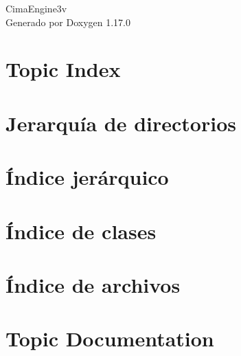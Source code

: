 \documentclass[twoside]{book}
\newcommand{\+}{\discretionary{\mbox{\scriptsize$\hookleftarrow$}}{}{}}
\newcommand{\clearemptydoublepage}{%
    \newpage{\pagestyle{empty}\cleardoublepage}%
  }
\begin{document}
  \raggedbottom
    \hypersetup{pageanchor=false,
                bookmarksnumbered=true,
                pdfencoding=unicode
               }
  \begin{titlepage}
  \vspace*{7cm}
  \begin{center}%
  {\Large Cima\+Engine3v}\\
  \vspace*{1cm}
  {\large Generado por Doxygen 1.17.0}\\
  \end{center}
  \end{titlepage}
  \clearemptydoublepage
  \tableofcontents
  \clearemptydoublepage
  \hypersetup{pageanchor=true}






\chapter{Topic Index}

\chapter{Jerarquía de directorios}

\chapter{Índice jerárquico}

\chapter{Índice de clases}

\chapter{Índice de archivos}

\chapter{Topic Documentation}







\end{document}
